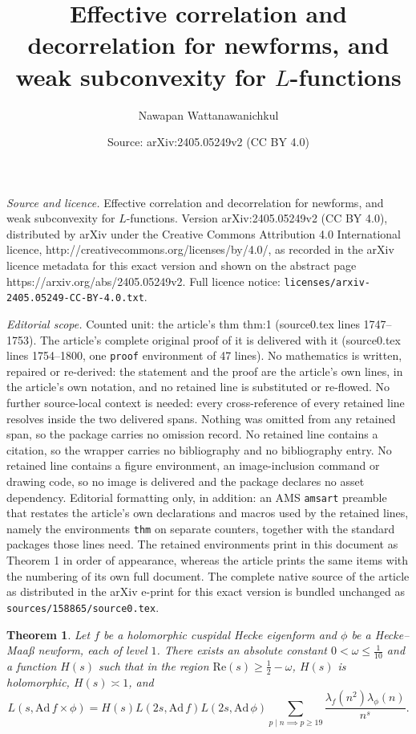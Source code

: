 \documentclass[10pt,a4paper]{amsart}
\title{Effective correlation and decorrelation for newforms, and weak subconvexity for $L$-functions}
\author{Nawapan Wattanawanichkul}
\date{Source: arXiv:2405.05249v2 (CC BY 4.0)}
\newtheorem{thm}{Theorem}
\begin{document}
\maketitle

\noindent\emph{Source and licence.} Effective correlation and decorrelation for newforms, and weak subconvexity for $L$-functions. Version arXiv:2405.05249v2 (CC BY 4.0), distributed by arXiv under the Creative Commons Attribution 4.0 International licence, http://creativecommons.org/licenses/by/4.0/, as recorded in the arXiv licence metadata for this exact version and shown on the abstract page https://arxiv.org/abs/2405.05249v2. Full licence notice: \texttt{licenses/arxiv-2405.05249-CC-BY-4.0.txt}.\par\smallskip

\noindent\textit{Editorial scope.} Counted unit: the article's thm thm:1 (source0.tex lines 1747--1753). The article's complete original proof of it is delivered with it (source0.tex lines 1754--1800, one \texttt{proof} environment of 47 lines). No mathematics is written, repaired or re-derived: the statement and the proof are the article's own lines, in the article's own notation, and no retained line is substituted or re-flowed.  No further source-local context is needed: every cross-reference of every retained line resolves inside the two delivered spans.  Nothing was omitted from any retained span, so the package carries no omission record.  No retained line contains a citation, so the wrapper carries no bibliography and no bibliography entry.  No retained line contains a figure environment, an image-inclusion command or drawing code, so no image is delivered and the package declares no asset dependency.  Editorial formatting only, in addition: an AMS \texttt{amsart} preamble that restates the article's own declarations and macros used by the retained lines, namely the environments \texttt{thm} on separate counters, together with the standard packages those lines need.  The retained environments print in this document as Theorem 1 in order of appearance, whereas the article prints the same items with the numbering of its own full document.  The complete native source of the article as distributed in the arXiv e-print for this exact version is bundled unchanged as \texttt{sources/158865/source0.tex}.
\begin{thm}
\label{thm:1}
Let $f$ be a holomorphic cuspidal Hecke eigenform and $\phi$ be a Hecke--Maa{\ss} newform, each of level $1$.  There exists an absolute constant $0<\omega\leq \frac{1}{10}$ and a function $H(s)$ such that in the region $\mathrm{Re}(s)\geq \frac{1}{2}-\omega$, $H(s)$ is holomorphic, $H(s)\asymp 1$, and
\[
L(s,\mathrm{Ad}\, f\times \phi)=H(s) L(2s,\mathrm{Ad}\, f) L(2s,\mathrm{Ad}\, \phi) \sum_{p\mid n\implies p\ge 19}\frac{\lambda_{f}(n^2)\lambda_{\phi}(n)}{n^{s}}.
\]
\end{thm}
\end{document}
